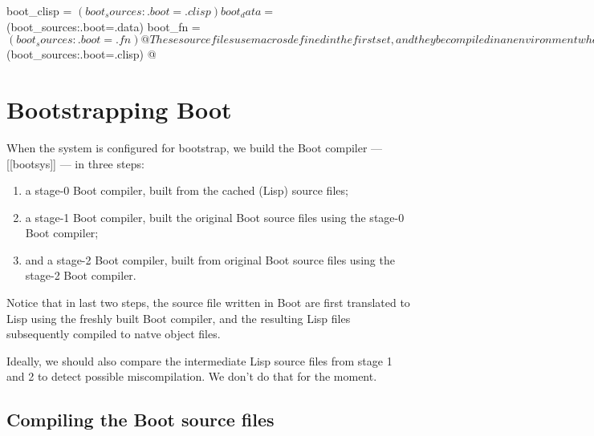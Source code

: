 \documentclass{article}
\begin{document}
boot_clisp = $(boot_sources:.boot=.clisp)
boot_data = $(boot_sources:.boot=.data)
boot_fn = $(boot_sources:.boot=.fn)
@
These source files use macros defined in the first set, and they be compiled
in an environment where those macros are present.

Since the Boot language is defined as a syntactic sugar over Lisp
(a reasonably tasty sugar), the
the second set of source files (written in Boot) is first translated
to Lisp, and the result of that translation is subsequently compiled to
native object files.

Partly for bootstrapping reasons, and partly because Axiom (therefore
Boot) is not yet widespread, the pamphlets for the source files written
in Boot currently keep a cache of their translated versions.  Hopefully
the maintenance of that cache will be unnecessary as the build machinery
becomes more and more improved, and Axiom gets in widespread use.
<<environment>>=
boot_cached_clisp = $(boot_sources:.boot=.clisp)
@

\section{Bootstrapping Boot}
\label{sec:bootstrapping}

When the system is configured for bootstrap, we build the Boot compiler ---
[[bootsys]] --- in three steps:
\begin{enumerate}
\item a stage-0 Boot compiler, built from the cached (Lisp) source files;

\item a stage-1 Boot compiler, built the original Boot source files using the
  stage-0 Boot compiler;

\item and a stage-2 Boot compiler, built from original Boot source files
  using the stage-2 Boot compiler.
\end{enumerate}
Notice that in last two steps, the source file written in Boot are first
translated to Lisp using the freshly built Boot compiler, and the resulting
Lisp files subsequently compiled to natve object files.

Ideally, we should also compare the intermediate Lisp source files from
stage 1 and 2 to detect possible miscompilation.  We don't do that
for the moment.

\subsection{Compiling the Boot source files}
\label{sec:bootstrapping:source-files}
\end{document}
